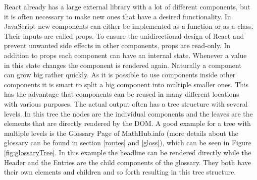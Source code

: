 \documentclass[11pt,a4paper]{article}
\begin{document}
React already has a large external library with a lot of different components, but it is often necessary to make new ones that have a desired functionality.
In JavaScript new components can either be implemented as a function or as a class.
Their inputs are called props.
To ensure the unidirectional design of React and prevent unwanted side effects in other components, props are read-only.
In addition to props each component can have an internal state.
Whenever a value in this state changes the component is rendered again.
Naturally a component can grow big rather quickly.
As it is possible to use components inside other components it is smart to split a big component into multiple smaller ones.
This has the advantage that components can be reused in many different locations with various purposes.
The actual output often has a tree structure with several levels.
In this tree the nodes are the individual components and the leaves are the elements that are directly rendered by the DOM.
A good example for a tree with multiple levels is the Glossary Page of MathHub.info (more details about the glossary can be found in section \ref{routes} and \ref{gloss}), which can be seen in Figure \ref{fig:glossaryTree}.
In this example the headline can be rendered directly while the Header and the Entries are the child components of the glossary.
They both have their own elements and children and so forth resulting in this tree structure.
\end{document}
